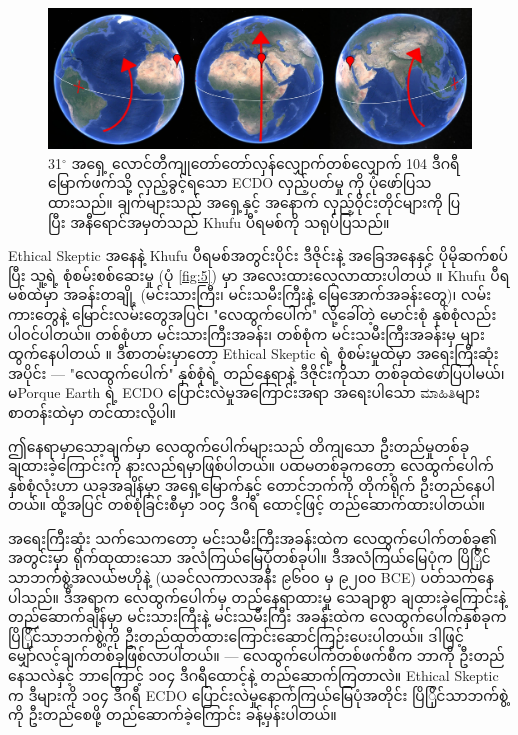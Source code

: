 \documentclass[10pt,twocolumn,letterpaper]{article}
\begin{document}
\begin{figure}[b]
\begin{center}
\includegraphics[width=1\textwidth]{drawing.jpg}
\end{center}
   \caption{31$^\circ$ အရှေ့ လောင်တီကျုတော်တော်လှန်လျှောက်တစ်လျှောက် 104 ဒီဂရီ မြောက်ဖက်သို့ လှည့်ခွင့်ရသော ECDO လှည့်ပတ်မှု ကို ပုံဖော်ပြသထားသည်။ ချက်များသည် အရှေ့နှင့် အနောက် လှည့်ဝိုင်းတိုင်များကို ပြပြီး အနီရောင်အမှတ်သည် Khufu ပီရမစ်ကို သရုပ်ပြသည်။}
\label{fig:6}
\end{figure}
Ethical Skeptic အနေနဲ့ Khufu ပီရမစ်အတွင်းပိုင်း ဒီဇိုင်းနဲ့ အခြေအနေနှင့် ပိုမိုဆက်စပ်ပြီး သူ့ရဲ့ စုံစမ်းစစ်ဆေးမှု (ပုံ \ref{fig:5}) မှာ အလေးထားလေ့လာထားပါတယ် \cite{28}။ Khufu ပီရမစ်ထဲမှာ အခန်းတချို့ (မင်းသားကြီး၊ မင်းသမီးကြီးနဲ့ မြေအောက်အခန်းတွေ)၊ လမ်းကားတွေနဲ့ မြောင်းလမ်းတွေအပြင်၊ "လေထွက်ပေါက်" လို့ခေါ်တဲ့ မောင်းစုံ နှစ်စုံလည်းပါဝင်ပါတယ်။ တစ်စုံဟာ မင်းသားကြီးအခန်း၊ တစ်စုံက မင်းသမီးကြီးအခန်း‌မှ များထွက်နေပါတယ် \cite{29,30}။ ဒီစာတမ်းမှာတော့ Ethical Skeptic ရဲ့ စုံစမ်းမှုထဲမှာ အရေးကြီးဆုံးအပိုင်း — "လေထွက်ပေါက်" နှစ်စုံရဲ့ တည်နေရာနဲ့ ဒီဇိုင်းကိုသာ တစ်ခုထဲဖော်ပြပါမယ်၊ မPorque Earth ရဲ့ ECDO ပြောင်းလဲမှုအကြောင်းအရာ အရေးပါသော ಮಾಹಿತಿများ စာတန်းထဲမှာ တင်ထားလို့ပါ။

ဤနေရာမှာသော့ချက်မှာ လေထွက်ပေါက်များသည် တိကျသော ဦးတည်မှုတစ်ခု ချထားခဲ့ကြောင်းကို နားလည်ရမှာဖြစ်ပါတယ်။ ပထမတစ်ခုကတော့ လေထွက်ပေါက် နှစ်စုံလုံးဟာ ယခုအချိန်မှာ အရှေ့မြောက်နှင့် တောင်ဘက်ကို တိုက်ရိုက် ဦးတည်နေပါတယ်။ ထို့အပြင် တစ်စုံခြင်းစီမှာ ၁၀၄ ဒီဂရီ ထောင့်ဖြင့် တည်ဆောက်ထားပါတယ်။

အရေးကြီးဆုံး သက်သေကတော့ မင်းသမီးကြီးအခန်းထဲက လေထွက်ပေါက်တစ်ခု၏ အတွင်းမှာ ရိုက်ထုထားသော အလံကြယ်မြေပုံတစ်ခုပါ။ ဒီအလံကြယ်မြေပုံက ပြိြိုင်သာဘက်စွဲ့အလယ်ဗဟိုနဲ့ (ယခင်လကာလအနီး ၉၆၀၀ မှ ၉၂၀၀ BCE) ပတ်သက်နေပါသည်။ ဒီအရာက လေထွက်ပေါက်မှ တည်နေရာထားမှု သေချာစွာ ချထားခဲ့ကြောင်းနဲ့ တည်ဆောက်ချိန်မှာ မင်းသားကြီးနဲ့ မင်းသမီးကြီး အခန်းထဲက လေထွက်ပေါက်နှစ်ခုက ပြိြိုင်သာဘက်စွဲ့ကို ဦးတည်ထုတ်ထားကြောင်းဆောင်ကြဉ်းပေးပါတယ်။ ဒါဖြင့် မျှော်လင့်ချက်တစ်ခုဖြစ်လာပါတယ်။ — လေထွက်ပေါက်တစ်ဖက်စီက ဘာကို ဦးတည်နေသလဲနှင့် ဘာကြောင့် ၁၀၄ ဒီဂရီထောင့်နဲ့ တည်ဆောက်ကြတာလဲ။ Ethical Skeptic က ဒီများကို ၁၀၄ ဒီဂရီ ECDO ပြောင်းလဲမှုနောက်ကြယ်မြေပုံအတိုင်း ပြိြိုင်သာဘက်စွဲ့ကို ဦးတည်စေဖို့ တည်ဆောက်ခဲ့ကြောင်း ခန့်မှန်းပါတယ်။
\end{document}
